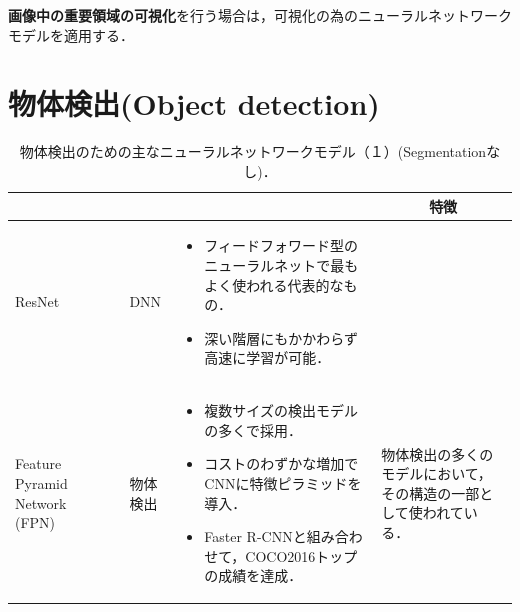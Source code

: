 \documentclass[originalpaper,fleqn]{jsaiart}     %
\begin{document}
{\bf 画像中の重要領域の可視化}を行う場合は，可視化の為のニューラルネットワークモデル\cite{SCDVPB17,SCDVPB20}を適用する．

\section{物体検出(Object detection)}
\begin{table}
    \caption{物体検出のための主なニューラルネットワークモデル（１）(Segmentationなし)．}
    \label{tbl-cheat1}
    \begin{center}
        \setlength{\tabcolsep}{3pt}
        \footnotesize
        \begin{tabularx}{\linewidth}{Xp{1.5cm}Xp{7cm}X} \toprule
            \centering{モデル名称} & \centering{文献} & \centering{用途} & \centering{概要} & \multicolumn{1}{c}{特徴} \\ \midrule

            ResNet & \cite{HZRS16} & DNN & 
            \begin{itemize}
                \vspace{-0.7\baselineskip}
                \setlength{\leftskip}{-3mm}
                \item フィードフォワード型のニューラルネットで最もよく使われる代表的なもの．
                \item  深い階層にもかかわらず高速に学習が可能．
            \end{itemize} &   \\
            
            Feature Pyramid Network (FPN) & \cite{LDGHHB17} & 物体検出 & 
            \begin{itemize}
                \vspace{-0.7\baselineskip}
                \setlength{\leftskip}{-3mm}
                \item 複数サイズの検出モデルの多くで採用．
                \item コストのわずかな増加でCNNに特徴ピラミッドを導入．
                \item Faster R-CNNと組み合わせて，COCO2016トップの成績を達成． 
            \end{itemize}
            & 物体検出の多くのモデルにおいて，その構造の一部として使われている．\\


\end{tabularx}
\end{center}
\end{table}
\end{document}
